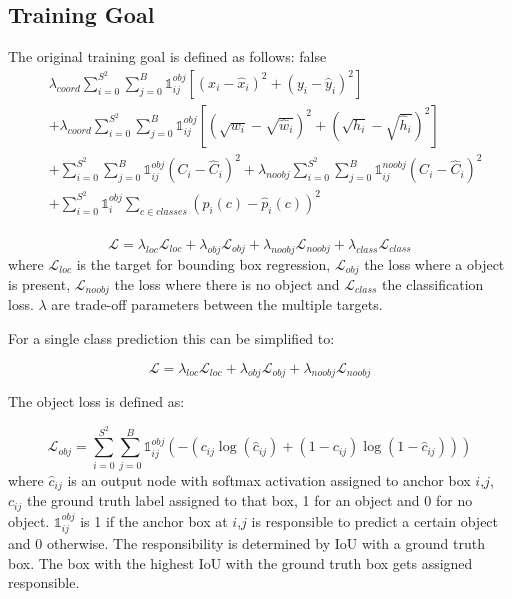 	\subsection{Training Goal}
	The original training goal is defined as follows:
	\if false
	\begin{align}
	&\lambda_{coord} \sum_{i=0}^{S^2}\sum_{j=0}^B \mathbb{1}_{ij}^{obj}[(x_i-\hat{x}_i)^2 + (y_i-\hat{y}_i)^2 ] \\&+ \lambda_{coord} \sum_{i=0}^{S^2}\sum_{j=0}^B \mathbb{1}_{ij}^{obj}[(\sqrt{w_i}-\sqrt{\hat{w}_i})^2 +(\sqrt{h_i}-\sqrt{\hat{h}_i})^2 ]\\
	&+ \sum_{i=0}^{S^2}\sum_{j=0}^B \mathbb{1}_{ij}^{obj}(C_i - \hat{C}_i)^2 + \lambda_{noobj}\sum_{i=0}^{S^2}\sum_{j=0}^B \mathbb{1}_{ij}^{noobj}(C_i - \hat{C}_i)^2 \\
	&+ \sum_{i=0}^{S^2} \mathbb{1}_{i}^{obj}\sum_{c \in classes}(p_i(c) - \hat{p}_i(c))^2 \\
	\end{align}
	\fi
	
	\begin{equation}
	\mathcal{L} = \lambda_{loc}\mathcal{L}_{loc} + \lambda_{obj}\mathcal{L}_{obj} + \lambda_{noobj}\mathcal{L}_{noobj} + \lambda_{class}\mathcal{L}_{class}
	\end{equation}
	where $\mathcal{L}_{loc}$ is the target for bounding box regression, $\mathcal{L}_{obj}$ the loss where a object is present, $\mathcal{L}_{noobj}$ the loss where there is no object and $\mathcal{L}_{class}$ the classification loss. $\lambda$ are trade-off parameters between the multiple targets.
	
	For a single class prediction this can be simplified to:
	
	\begin{equation}
	\mathcal{L} = \lambda_{loc}\mathcal{L}_{loc} + \lambda_{obj}\mathcal{L}_{obj} + \lambda_{noobj}\mathcal{L}_{noobj}
	\end{equation}
	
	The object loss is defined as:
	
	\begin{equation}
		\mathcal{L}_{obj} = \sum_{i=0}^{S^2}\sum_{j=0}^B \mathbb{1}_{ij}^{obj}(-(c_{ij}\log(\hat c_{ij}) + (1 - c_{ij})\log(1 - \hat c_{ij})))
	\end{equation}
	where $\hat c_{ij}$ is an output node with softmax activation assigned to anchor box $i$,$j$, $ c_{ij}$ the ground truth label assigned to that box, 1 for an object and 0 for no object.  $\mathbb{1}_{ij}^{obj}$ is 1 if the anchor box at $i$,$j$ is responsible to predict a certain object and 0 otherwise. The responsibility is determined by \ac{IoU} with a ground truth box. The box with the highest \ac{IoU} with the ground truth box gets assigned responsible.
	
